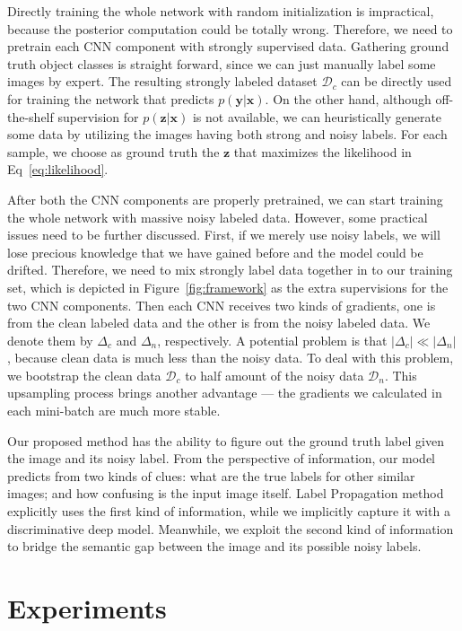 \documentclass[10pt,twocolumn,letterpaper]{article}
\def\vec{\mathbf}
\begin{document}
Directly training the whole network with random initialization is impractical, because the posterior computation could be totally wrong. Therefore, we need to pretrain each CNN component with strongly supervised data. Gathering ground truth object classes is straight forward, since we can just manually label some images by expert. The resulting strongly labeled dataset $\mathcal{D}_c$ can be directly used for training the network that predicts $p(\vec{y}|\vec{x})$. On the other hand, although off-the-shelf supervision for $p(\vec{z}|\vec{x})$ is not available, we can heuristically generate some data by utilizing the images having both strong and noisy labels. For each sample, we choose as ground truth the $\vec{z}$ that maximizes the likelihood in Eq~\eqref{eq:likelihood}.

After both the CNN components are properly pretrained, we can start training the whole network with massive noisy labeled data. However, some practical issues need to be further discussed. First, if we merely use noisy labels, we will lose precious knowledge that we have gained before and the model could be drifted. Therefore, we need to mix strongly label data together in to our training set, which is depicted in Figure~\ref{fig:framework} as the extra supervisions for the two CNN components. Then each CNN receives two kinds of gradients, one is from the clean labeled data and the other is from the noisy labeled data. We denote them by $\Delta_c$ and $\Delta_n$, respectively. A potential problem is that $|\Delta_c| \ll |\Delta_n|$, because clean data is much less than the noisy data. To deal with this problem, we bootstrap the clean data $\mathcal{D}_c$ to half amount of the noisy data $\mathcal{D}_n$. This upsampling process brings another advantage --- the gradients we calculated in each mini-batch are much more stable.

Our proposed method has the ability to figure out the ground truth label given the image and its noisy label. From the perspective of information, our model predicts from two kinds of clues: what are the true labels for other similar images; and how confusing is the input image itself. Label Propagation method~\cite{zhu2002learning} explicitly uses the first kind of information, while we implicitly capture it with a discriminative deep model. Meanwhile, we exploit the second kind of information to bridge the semantic gap between the image and its possible noisy labels.

\section{Experiments} %
\label{sec:experiments}
\end{document}
